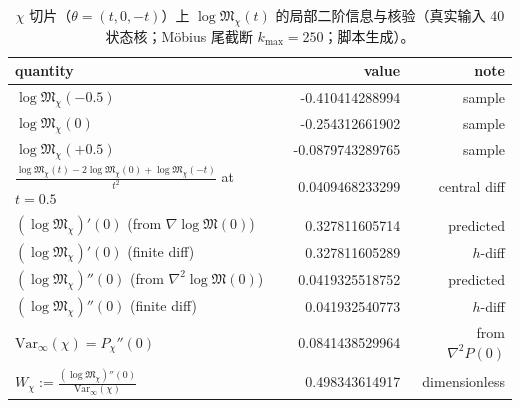 \begin{table}[H]
\centering
\scriptsize
\setlength{\tabcolsep}{6pt}
\renewcommand{\arraystretch}{1.15}
\caption{$\chi$ 切片（$\theta=(t,0,-t)$）上 $\log\mathfrak{M}_\chi(t)$ 的局部二阶信息与核验（真实输入 40 状态核；Möbius 尾截断 $k_{\max}=250$；脚本生成）。}
\label{tab:real-input-40-logM-chi-local-derivatives}
\begin{tabular}{@{}lrr@{}}
\toprule
quantity & value & note \\
\midrule
$\log\mathfrak{M}_\chi(-0.5)$ & -0.410414288994 & sample \\
$\log\mathfrak{M}_\chi(0)$ & -0.254312661902 & sample \\
$\log\mathfrak{M}_\chi(+0.5)$ & -0.0879743289765 & sample \\
\midrule
$\frac{\log\mathfrak{M}_\chi(t)-2\log\mathfrak{M}_\chi(0)+\log\mathfrak{M}_\chi(-t)}{t^2}$ at $t=0.5$ & 0.0409468233299 & central diff \\
\midrule
$(\log\mathfrak{M}_\chi)'(0)$ (from $\nabla\log\mathfrak{M}(0)$) & 0.327811605714 & predicted \\
$(\log\mathfrak{M}_\chi)'(0)$ (finite diff) & 0.327811605289 & $h$-diff \\
$(\log\mathfrak{M}_\chi)''(0)$ (from $\nabla^2\log\mathfrak{M}(0)$) & 0.0419325518752 & predicted \\
$(\log\mathfrak{M}_\chi)''(0)$ (finite diff) & 0.041932540773 & $h$-diff \\
\midrule
$\mathrm{Var}_\infty(\chi)=P_\chi''(0)$ & 0.0841438529964 & from $\nabla^2 P(0)$ \\
$W_\chi:=\frac{(\log\mathfrak{M}_\chi)''(0)}{\mathrm{Var}_\infty(\chi)}$ & 0.498343614917 & dimensionless \\
\bottomrule
\end{tabular}
\end{table}

